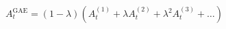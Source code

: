 \documentclass[preview]{standalone}
\begin{document}
\begin{align*}
A^{\text{GAE}}_{t} = (1 - \lambda)\left(A^{(1)}_{t} + \lambda A^{(2)}_{t} + \lambda ^{2}A^{(3)}_{t} + \dots\right)
\end{align*}
\end{document}
